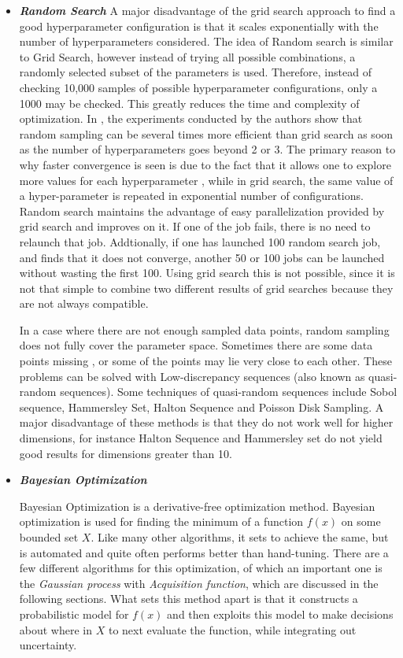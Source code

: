 \documentclass[twoside]{article}
\begin{document}
\begin{itemize}
\item \textit{\textbf{Random Search}}
A major disadvantage of the grid search approach to find a good hyperparameter configuration is that it scales exponentially with the number of hyperparameters considered. \cite{bengio2012practical}
The idea of Random search is similar to Grid Search, however instead of trying all possible combinations, a randomly selected subset of the parameters is used. Therefore, instead of checking 10,000 samples of possible hyperparameter configurations, only a 1000 may be checked. This greatly reduces the time and complexity of optimization. 
In \cite{bergstra2012random}, the experiments conducted by the authors show that random sampling can be several times more efficient than grid search as soon as the number of hyperparameters goes beyond 2 or 3. The primary reason to why faster convergence is seen is due to the fact that it allows one to explore more values for each hyperparameter \cite{bengio2012practical}, while in grid search, the same value of a hyper-parameter is repeated in exponential number of configurations.
Random search maintains the advantage of easy parallelization provided by grid search and improves on it. If one of the job fails, there is no need to relaunch that job. Addtionally, if one has launched 100 random search job, and finds that it does not converge, another 50 or 100 jobs can be launched without wasting the first 100. \cite{bengio2012practical} Using grid search this is not possible, since it is not that simple to combine two different results of grid searches because they are not always compatible.


In a case where there are not enough sampled data points, random sampling does not fully cover the parameter space. Sometimes there are some data points missing , or some of the points may lie very close to each other. These problems can be solved with Low-discrepancy sequences \cite{bergstra2012random} (also known as quasi-random sequences). Some techniques of quasi-random sequences include Sobol sequence, Hammersley Set, Halton Sequence and Poisson Disk Sampling. \cite{branicky2001quasi} A major disadvantage of these methods is that they do not work well for higher dimensions, for instance Halton Sequence and Hammersley set do not yield good results for dimensions greater than 10. \cite{branicky2001quasi}
\item \textit{\textbf{Bayesian Optimization}}

Bayesian Optimization is a derivative-free optimization method. Bayesian optimization is used for finding the minimum of a function $f(x)$ on some bounded set $X$. Like many other algorithms, it sets to achieve the same, but is automated and quite often performs better than hand-tuning. There are a few different algorithms for this optimization, of which an important one is the \textit{Gaussian process} with \textit{Acquisition function}, which are discussed in the following sections. What sets this method apart is that it constructs a probabilistic model for $f(x)$ and then exploits this model to make decisions about where in $X$ to next evaluate the function, while integrating out uncertainty. \cite{snoek2012practical}


\end{itemize}
\end{document}
